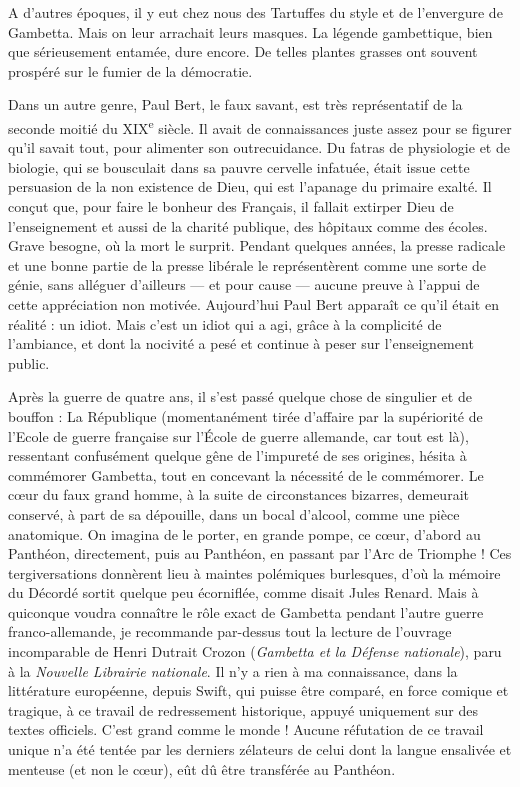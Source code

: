 \documentclass[french,twoside]{book} %
\begin{document}
A d’autres époques, il y eut chez nous des Tartuffes du style et de l’envergure de Gambetta. Mais on leur arrachait leurs masques. La légende gambettique, bien que sérieusement entamée, dure encore. De telles plantes grasses ont souvent prospéré sur le fumier de la démocratie.\par
Dans un autre genre, Paul Bert, le faux savant, est très représentatif de la seconde moitié du XIX\textsuperscript{e} siècle. Il avait de connaissances juste assez pour se figurer qu’il savait tout, pour alimenter son outrecuidance. Du fatras de physiologie et de biologie, qui se bousculait dans sa pauvre cervelle infatuée, était issue cette persuasion de la non existence de Dieu, qui est l’apanage du primaire exalté. Il conçut que, pour faire le bonheur des Français, il fallait extirper Dieu de l’enseignement et aussi de la charité publique, des hôpitaux comme des écoles. Grave besogne, où la mort le surprit. Pendant quelques années, la presse radicale et une bonne partie de la presse libérale le représentèrent comme une sorte de génie, sans alléguer d’ailleurs — et pour cause — aucune preuve à l’appui de cette appréciation non motivée. Aujourd’hui Paul Bert apparaît ce qu’il était en réalité : un idiot. Mais c’est un idiot qui a agi, grâce à la complicité de l’ambiance, et dont la nocivité a pesé et continue à peser sur l’enseignement public.\par
Après la guerre de quatre ans, il s’est passé quelque chose de singulier et de bouffon : La République (momentanément tirée d’affaire par la supériorité de l’Ecole de guerre française sur l’École de guerre allemande, car tout est là), ressentant confusément quelque gêne de l’impureté de ses origines, hésita à commémorer Gambetta, tout en concevant la nécessité de le commémorer. Le cœur du faux grand homme, à la suite de circonstances bizarres, demeurait conservé, à part de sa dépouille, dans un bocal d’alcool, comme une pièce anatomique. On imagina de le porter, en grande pompe, ce cœur, d’abord au Panthéon, directement, puis au Panthéon, en passant par l’Arc de Triomphe ! Ces tergiversations donnèrent lieu à maintes polémiques burlesques, d’où la mémoire du Décordé sortit quelque peu écorniflée, comme disait Jules Renard. Mais à quiconque voudra connaître le rôle exact de Gambetta pendant l’autre guerre franco-allemande, je recommande par-dessus tout la lecture de l’ouvrage incomparable de Henri Dutrait Crozon ({\itshape Gambetta et la Défense nationale}), paru à la {\itshape Nouvelle Librairie nationale}. Il n’y a rien à ma connaissance, dans la littérature européenne, depuis Swift, qui puisse être comparé, en force comique et tragique, à ce travail de redressement historique, appuyé uniquement sur des textes officiels. C’est grand comme le monde ! Aucune réfutation de ce travail unique n’a été tentée par les derniers zélateurs de celui dont la langue ensalivée et menteuse (et non le cœur), eût dû être transférée au Panthéon.\par
\end{document}
